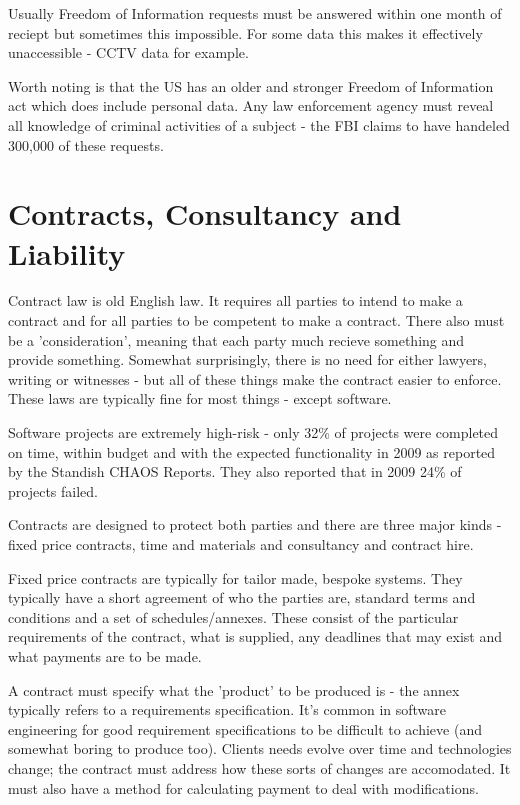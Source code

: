 \documentclass{article}
\begin{document}
	\par 
	Usually Freedom of Information requests must be answered within one month of reciept but sometimes this impossible. For some data this makes it effectively unaccessible - CCTV data for example. 
	
	\par Worth noting is that the US has an older and stronger Freedom of Information act which does include personal data. Any law enforcement agency must reveal all knowledge of criminal activities of a subject - the FBI claims to have handeled 300,000 of these requests.
	
	\section{Contracts, Consultancy and Liability}
	Contract law is old English law. It requires all parties to intend to make a contract and for all parties to be competent to make a contract. There also must be a 'consideration', meaning that each party much recieve something and provide something. Somewhat surprisingly, there is no need for either lawyers, writing or witnesses - but all of these things make the contract easier to enforce. These laws are typically fine for most things - except software.
	
	\par 
	Software projects are extremely high-risk - only 32\% of projects were completed on time, within budget and with the expected functionality in 2009 as reported by the Standish CHAOS Reports. They also reported that in 2009 24\% of projects failed.
	
	\par 
	Contracts are designed to protect both parties and there are three major kinds - fixed price contracts, time and materials and consultancy and contract hire.
	
	\par Fixed price contracts are typically for tailor made, bespoke systems. They typically have a short agreement of who the parties are, standard terms and conditions and a set of schedules/annexes. These consist of the particular requirements of the contract, what is supplied, any deadlines that may exist and what payments are to be made.
	
	\par A contract must specify what the 'product' to be produced is - the annex typically refers to a requirements specification. It's common in software engineering for good requirement specifications to be difficult to achieve (and somewhat boring to produce too). Clients needs evolve over time and technologies change; the contract must address how these sorts of changes are accomodated. It must also have a method for calculating payment to deal with modifications.
	
\end{document}
